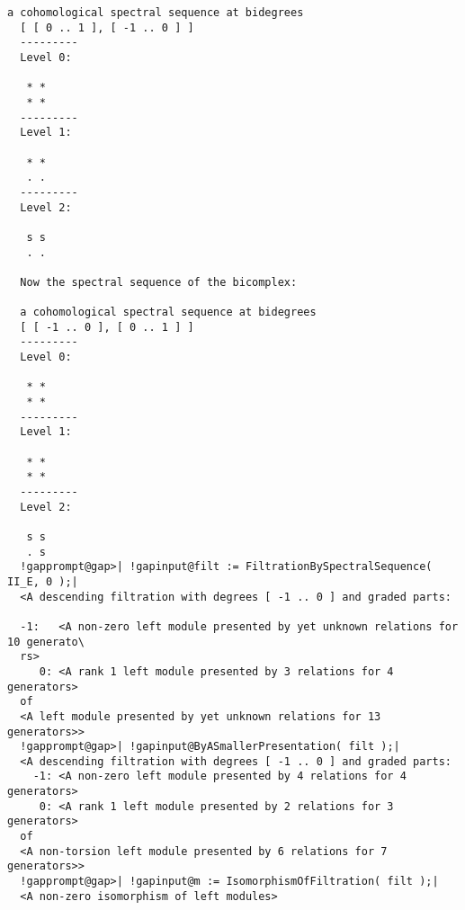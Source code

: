 \documentclass[a4paper,11pt]{report}
\begin{document}
{{\begin{Verbatim}[commandchars=!@|,fontsize=\small,frame=single,label=Example]
  a cohomological spectral sequence at bidegrees
  [ [ 0 .. 1 ], [ -1 .. 0 ] ]
  ---------
  Level 0:
  
   * *
   * *
  ---------
  Level 1:
  
   * *
   . .
  ---------
  Level 2:
  
   s s
   . .
  
  Now the spectral sequence of the bicomplex:
  
  a cohomological spectral sequence at bidegrees
  [ [ -1 .. 0 ], [ 0 .. 1 ] ]
  ---------
  Level 0:
  
   * *
   * *
  ---------
  Level 1:
  
   * *
   * *
  ---------
  Level 2:
  
   s s
   . s
  !gapprompt@gap>| !gapinput@filt := FiltrationBySpectralSequence( II_E, 0 );|
  <A descending filtration with degrees [ -1 .. 0 ] and graded parts:
  
  -1:	<A non-zero left module presented by yet unknown relations for 10 generato\
  rs>
     0:	<A rank 1 left module presented by 3 relations for 4 generators>
  of
  <A left module presented by yet unknown relations for 13 generators>>
  !gapprompt@gap>| !gapinput@ByASmallerPresentation( filt );|
  <A descending filtration with degrees [ -1 .. 0 ] and graded parts:
    -1:	<A non-zero left module presented by 4 relations for 4 generators>
     0:	<A rank 1 left module presented by 2 relations for 3 generators>
  of
  <A non-torsion left module presented by 6 relations for 7 generators>>
  !gapprompt@gap>| !gapinput@m := IsomorphismOfFiltration( filt );|
  <A non-zero isomorphism of left modules>
\end{Verbatim}
 }

  }

 

\appendix
\end{document}
